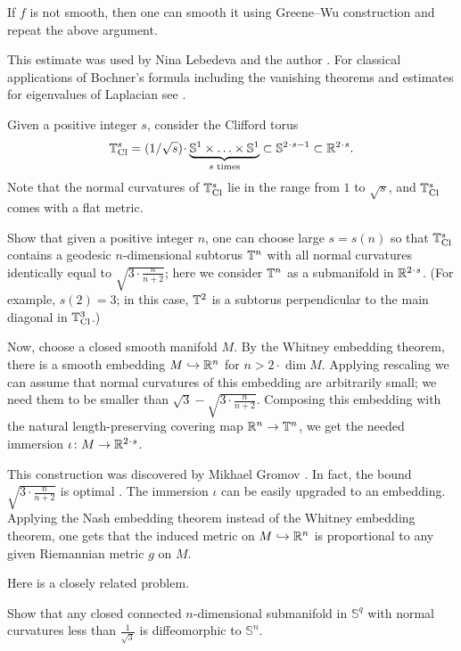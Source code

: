 If $f$ is not smooth, then one can smooth it using Greene--Wu construction \cite[Theorem~2]{greene-wu} and repeat the above argument.
\qedsf

This estimate was used by Nina Lebedeva and the author \cite{lebedeva-petrunin-curvature}.
For classical applications of Bochner's formula including the vanishing theorems and estimates for eigenvalues of Laplacian see \cite[][II \S 8]{lawson-michelsohn}.

Given a positive integer $s$,
consider the Clifford torus
\[\TT^s_{\text{Cl}}=\tfrac1{\sqrt{s}}\cdot\underbrace{\SSS^1\times\ldots\times\SSS^1}_\text{$s$ times}\subset\SSS^{2\cdot s-1}\subset\RR^{2\cdot s}.\]
Note that the normal curvatures of $\mathbb{T}^s_{\text{Cl}}$ lie in the range from $1$ to $\sqrt{s}$, and $\mathbb{T}^s_{\text{Cl}}$ comes with a flat metric.

Show that given a positive integer $n$, one can choose large $s=s(n)$
so that $\mathbb{T}^s_{\text{Cl}}$ contains a geodesic $n$-dimensional
subtorus $\mathbb{T}^n$ with all normal curvatures identically equal to $\sqrt{3\cdot\frac n{n+2}}$;
here we consider $\mathbb{T}^n$ as a submanifold in $\RR^{2\cdot s}$.
(For example, $s(2)=3$; in this case, $\mathbb{T}^2$ is a subtorus perpendicular to the main diagonal in $\mathbb{T}^3_{\text{Cl}}$.) 

Now, choose a closed smooth manifold $M$.
By the Whitney embedding theorem, there is a smooth embedding $M\hookrightarrow\mathbb{R}^n$ for $n>2\cdot \dim M$.
Applying rescaling we can assume that normal curvatures of this embedding are arbitrarily small;
we need them to be smaller than $\sqrt{3}-\sqrt{3\cdot\frac n{n+2}}$.
Composing this embedding with the natural length-preserving covering map $\mathbb{R}^n\to \mathbb{T}^n$, we get the needed immersion $\iota\:M\to \RR^{2\cdot s}$.
\qeds

This construction was discovered by Mikhael Gromov \cite[2.A]{gromov2022}.
In fact, the bound $\sqrt{3\cdot\frac n{n+2}}$ is optimal \cite{petrunin2023}.
The immersion $\iota$ can be easily upgraded to an embedding.
Applying the Nash embedding theorem instead of the Whitney embedding theorem,
one gets that the induced metric on $M\hookrightarrow\mathbb{R}^n$ is proportional to any given Riemannian metric $g$ on $M$.

Here is a closely related problem.

\begin{pr}
Show that any closed connected $n$-dimensional submanifold in $\mathbb{S}^q$ with normal curvatures less than $\tfrac1{\sqrt{3}}$ is diffeomorphic to $\mathbb{S}^n$.
\end{pr}


